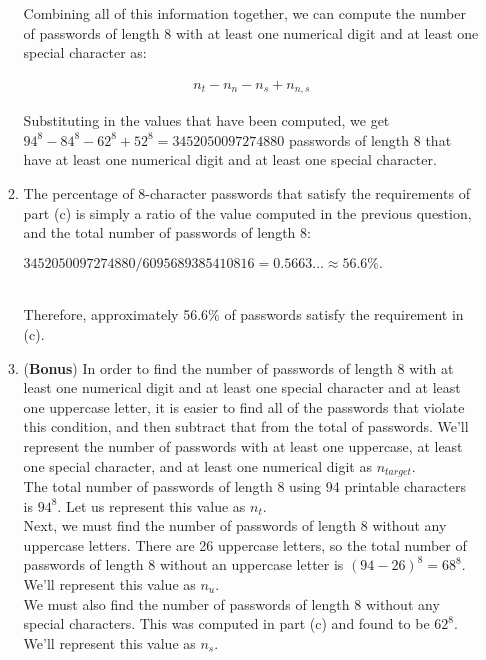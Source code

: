 \documentclass[11pt]{article}
\theoremstyle{definition}
\begin{document}
\begin{enumerate}
\begin{enumerate}
Combining all of this information together, we can compute the number of passwords of length 8 with at least one numerical digit and at least one special character as:

\begin{align*}
n_t - n_n - n_s + n_{n,s}
\end{align*}

Substituting in the values that have been computed, we get $94^8 - 84^8 - 62^8 + 52^8 = 3452050097274880$ passwords of length 8 that have at least one numerical digit and at least one special character.\\

\item The percentage of 8-character passwords that satisfy the requirements of part (c) is simply a ratio of the value computed in the previous question, and the total number of passwords
of length 8:\\
\centerline{$3452050097274880/6095689385410816 = 0.5663\ldots \approx 56.6\%.$}\\

Therefore, approximately 56.6\% of passwords satisfy the requirement in (c).\\

\item (\textbf{Bonus}) In order to find the number of passwords of length 8 with at least one numerical digit and at least one special character and at least one uppercase letter, it is easier to find
all of the passwords that violate this condition, and then subtract that from the total of passwords. We'll represent the number of passwords with at least one uppercase, at least one special character, and
at least one numerical digit as $n_{target}$.\\

The total number of passwords of length 8 using 94 printable characters is $94^8$. Let us represent this value as $n_{t}$.\\

Next, we must find the number of passwords of length 8 without any uppercase letters. There are 26 uppercase letters, so the total number of passwords of length 8 without an uppercase letter is $(94 - 26)^8 = 68^8$.
We'll represent this value as $n_{u}$.\\

We must also find the number of passwords of length 8 without any special characters. This was computed in part (c) and found to be $62^8$. We'll represent this value as $n_{s}$.\\


\end{enumerate}
\end{enumerate}
\end{document}

